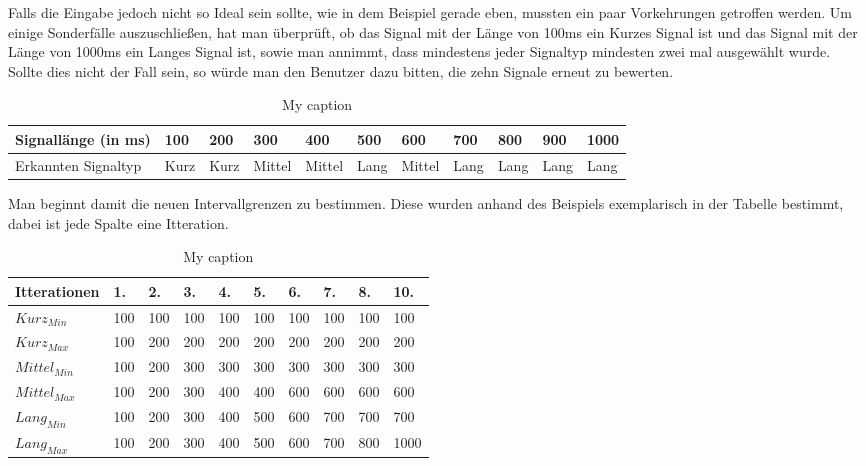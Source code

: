 Falls die Eingabe jedoch nicht so Ideal sein sollte, wie in dem Beispiel gerade eben, mussten ein paar Vorkehrungen getroffen werden. Um einige Sonderf{\"a}lle auszuschlie{\ss}en, hat man {\"u}berpr{\"u}ft, ob das Signal mit der L{\"a}nge von 100ms ein Kurzes Signal ist und das Signal mit der L{\"a}nge von 1000ms ein Langes Signal ist, sowie man annimmt, dass mindestens jeder Signaltyp mindesten zwei mal ausgew{\"a}hlt wurde. Sollte dies nicht der Fall sein, so w{\"u}rde man den Benutzer dazu bitten, die zehn Signale erneut zu bewerten. 

\begin{table}[]
\centering
\caption{My caption}
\label{my-label}
\begin{tabular}{|l|l|l|l|l|l|l|l|l|l|l|}
\hline
 Signall{\"a}nge (in ms) & 100 & 200 & 300 & 400 & 500 & 600 & 700 & 800 & 900 & 1000 \\ \hline
 Erkannten Signaltyp & Kurz & Kurz & Mittel & Mittel & Lang & Mittel & Lang & Lang & Lang & Lang \\ \hline
\end{tabular}
\end{table}

Man beginnt damit die neuen Intervallgrenzen zu bestimmen. Diese wurden anhand des Beispiels exemplarisch in der Tabelle bestimmt, dabei ist jede Spalte eine Itteration.

\begin{table}[]
\centering
\caption{My caption}
\label{my-label}
\begin{tabular}{|l|l|l|l|l|l|l|l|l|l|}
\hline
Itterationen            & 1. & 2. & 3. & 4. & 5. & 6. & 7. & 8. & 10. \\ \hline
$Kurz_{Min}$   & 100          & 100          & 100          & 100          & 100          & 100          & 100          & 100          & 100           \\ \hline
$Kurz_{Max}$   & 100          & 200          & 200          & 200          & 200          & 200          & 200          & 200          & 200           \\ \hline
$Mittel_{Min}$ & 100          & 200          & 300          & 300          & 300          & 300          & 300          & 300          & 300           \\ \hline
$Mittel_{Max}$ & 100          & 200          & 300          & 400          & 400          & 600          & 600          & 600          & 600           \\ \hline
$Lang_{Min}$   & 100          & 200          & 300          & 400          & 500          & 600          & 700          & 700          & 700           \\ \hline
$Lang_{Max}$   & 100          & 200          & 300          & 400          & 500          & 600          & 700          & 800          & 1000          \\ \hline
\end{tabular}
\end{table}

